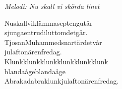 {\footnotesize\textit{Melodi: Nu skall vi skörda linet}}\par
\vspace{10pt}
Nuskallviklämmaseptengutår\\
sjungaentrudiluttomdetgår.\\
TjosanMuhammedsnartärdetvår\\
julaftonärenfredag.\\
Klunkklunkklunkklunkklunkklunk\\
blandaågeblandaåge\\
Abrakadabraklunkjulaftonärenfredag.
